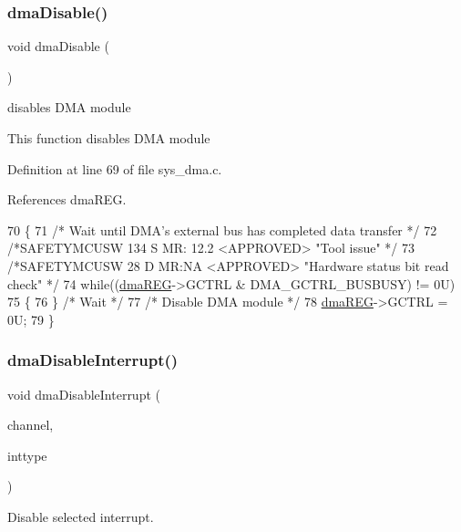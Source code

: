\subsubsection{\texorpdfstring{dma\+Disable()}{dmaDisable()}}
{\footnotesize\ttfamily void dma\+Disable (\begin{DoxyParamCaption}\item[{void}]{ }\end{DoxyParamCaption})}



disables D\+MA module 

This function disables D\+MA module 

Definition at line 69 of file sys\+\_\+dma.\+c.



References dma\+R\+EG.


\begin{DoxyCode}
70 \{
71     \textcolor{comment}{/* Wait until DMA's external bus has completed data transfer */}
72     \textcolor{comment}{/*SAFETYMCUSW 134 S MR: 12.2 <APPROVED> "Tool issue" */}
73     \textcolor{comment}{/*SAFETYMCUSW 28 D MR:NA <APPROVED> "Hardware status bit read check" */}
74     \textcolor{keywordflow}{while}((\mbox{\hyperlink{reg__dma_8h_aae27308852f460efc99fcbf6eb47ea86}{dmaREG}}->GCTRL & DMA\_GCTRL\_BUSBUSY) != 0U)
75     \{
76     \} \textcolor{comment}{/* Wait */}
77     \textcolor{comment}{/* Disable DMA module */}
78     \mbox{\hyperlink{reg__dma_8h_aae27308852f460efc99fcbf6eb47ea86}{dmaREG}}->GCTRL = 0U;
79 \}
\end{DoxyCode}
\mbox{\label{group__DMA_ga615b558e379e8a29221fc6be771d7c4e}} 
\subsubsection{\texorpdfstring{dma\+Disable\+Interrupt()}{dmaDisableInterrupt()}}
{\footnotesize\ttfamily void dma\+Disable\+Interrupt (\begin{DoxyParamCaption}\item[{uint32}]{channel,  }\item[{dma\+Interrupt\+\_\+t}]{inttype }\end{DoxyParamCaption})}



Disable selected interrupt. 


